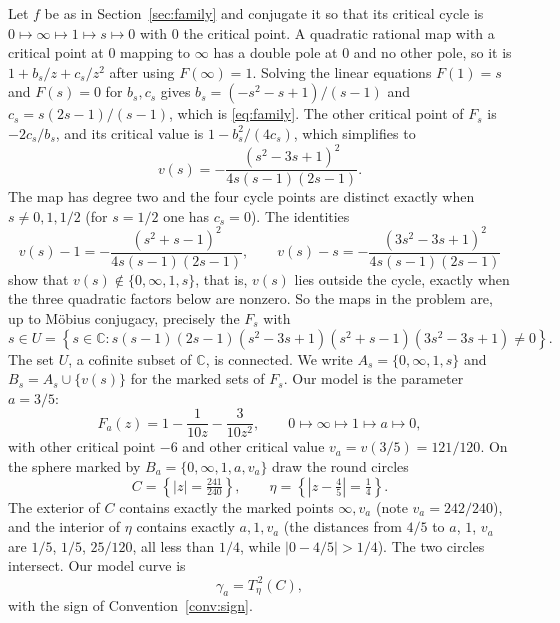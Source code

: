 \documentclass[12pt]{article}
\newcommand{\C}{\mathbb C}
\theoremstyle{remark}
\numberwithin{equation}{section}
\begin{document}
Let $f$ be as in Section~\ref{sec:family} and conjugate it so that its
critical cycle is $0\mapsto\infty\mapsto1\mapsto s\mapsto0$ with $0$ the
critical point. A quadratic rational map with a critical point at $0$
mapping to $\infty$ has a double pole at $0$ and no other pole, so it is
$1+b_s/z+c_s/z^2$ after using $F(\infty)=1$. Solving the linear equations
$F(1)=s$ and $F(s)=0$ for $b_s,c_s$ gives $b_s=(-s^2-s+1)/(s-1)$ and
$c_s=s(2s-1)/(s-1)$, which is \eqref{eq:family}. The other critical point of $F_s$ is $-2c_s/b_s$, and
its critical value is $1-b_s^2/(4c_s)$, which simplifies to
\begin{equation}\label{eq:vs}
 v(s)=-\frac{(s^2-3s+1)^2}{4s(s-1)(2s-1)} .
\end{equation}
The map has degree two and the four cycle points are distinct exactly when
$s\ne0,1,1/2$ (for $s=1/2$ one has $c_s=0$). The identities
\[
 v(s)-1=-\frac{(s^2+s-1)^2}{4s(s-1)(2s-1)},\qquad
 v(s)-s=-\frac{(3s^2-3s+1)^2}{4s(s-1)(2s-1)}
\]
show that $v(s)\notin\{0,\infty,1,s\}$, that is, $v(s)$ lies outside the
cycle, exactly when the three quadratic factors below are nonzero. So the
maps in the problem are, up to M\"obius conjugacy, precisely the $F_s$ with
\begin{equation}\label{eq:U}
 s\in U=\left\{s\in\C:
 s(s-1)(2s-1)(s^2-3s+1)(s^2+s-1)(3s^2-3s+1)\ne0\right\}.
\end{equation}
The set $U$, a cofinite subset of $\C$, is connected. We write
$A_s=\{0,\infty,1,s\}$ and $B_s=A_s\cup\{v(s)\}$ for the marked sets of
$F_s$. Our model is the parameter $a=3/5$:
\begin{equation}\label{eq:model}
 F_a(z)=1-\frac1{10z}-\frac3{10z^2},\qquad
 0\longmapsto\infty\longmapsto1\longmapsto a\longmapsto0,
\end{equation}
with other critical point $-6$ and other critical value
$v_a=v(3/5)=121/120$. On the sphere marked by
$B_a=\{0,\infty,1,a,v_a\}$ draw the round circles
\begin{equation}\label{eq:circles}
 C=\left\{|z|=\tfrac{241}{240}\right\},\qquad
 \eta=\left\{\left|z-\tfrac45\right|=\tfrac14\right\}.
\end{equation}
The exterior of $C$ contains exactly the marked points $\infty,v_a$
(note $v_a=242/240$), and the interior of $\eta$ contains exactly $a,1,v_a$
(the distances from $4/5$ to $a$, $1$, $v_a$ are $1/5$, $1/5$, $25/120$,
all less than $1/4$, while $|0-4/5|>1/4$). The two circles intersect. Our
model curve is
\begin{equation}\label{eq:answer}
 \boxed{\ \gamma_a=T_\eta^{\,2}(C),\ }
\end{equation}
with the sign of Convention~\ref{conv:sign}.
\end{document}
